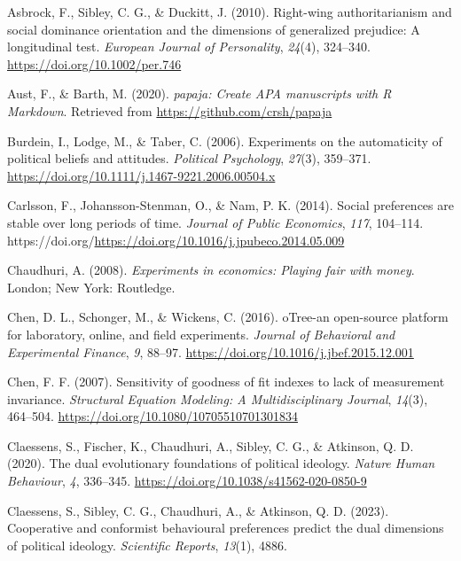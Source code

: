 \documentclass[
  man,floatsintext]{apa6}
\newlength{\cslhangindent}
\newlength{\cslentryspacingunit} %
\newenvironment{CSLReferences}[2] %
 {%
  \setlength{\parindent}{0pt}
  \ifodd #1
  \let\oldpar\par
  \def\par{\hangindent=\cslhangindent\oldpar}
  \fi
  \setlength{\parskip}{#2\cslentryspacingunit}
 }%
 {}
\begin{document}
\hypertarget{refs}{}
\begin{CSLReferences}{1}{0}
\leavevmode{}%
Asbrock, F., Sibley, C. G., \& Duckitt, J. (2010). Right-wing authoritarianism and social dominance orientation and the dimensions of generalized prejudice: A longitudinal test. \emph{European Journal of Personality}, \emph{24}(4), 324--340. \url{https://doi.org/10.1002/per.746}

\leavevmode{}%
Aust, F., \& Barth, M. (2020). \emph{{papaja}: {Create} {APA} manuscripts with {R Markdown}}. Retrieved from \url{https://github.com/crsh/papaja}

\leavevmode{}%
Burdein, I., Lodge, M., \& Taber, C. (2006). Experiments on the automaticity of political beliefs and attitudes. \emph{Political Psychology}, \emph{27}(3), 359--371. \url{https://doi.org/10.1111/j.1467-9221.2006.00504.x}

\leavevmode{}%
Carlsson, F., Johansson-Stenman, O., \& Nam, P. K. (2014). Social preferences are stable over long periods of time. \emph{Journal of Public Economics}, \emph{117}, 104--114. https://doi.org/\url{https://doi.org/10.1016/j.jpubeco.2014.05.009}

\leavevmode{}%
Chaudhuri, A. (2008). \emph{Experiments in economics: Playing fair with money}. London; New York: Routledge.

\leavevmode{}%
Chen, D. L., Schonger, M., \& Wickens, C. (2016). {oTree}-an open-source platform for laboratory, online, and field experiments. \emph{Journal of Behavioral and Experimental Finance}, \emph{9}, 88--97. \url{https://doi.org/10.1016/j.jbef.2015.12.001}

\leavevmode{}%
Chen, F. F. (2007). Sensitivity of goodness of fit indexes to lack of measurement invariance. \emph{Structural Equation Modeling: A Multidisciplinary Journal}, \emph{14}(3), 464--504. \url{https://doi.org/10.1080/10705510701301834}

\leavevmode{}%
Claessens, S., Fischer, K., Chaudhuri, A., Sibley, C. G., \& Atkinson, Q. D. (2020). The dual evolutionary foundations of political ideology. \emph{Nature Human Behaviour}, \emph{4}, 336--345. \url{https://doi.org/10.1038/s41562-020-0850-9}

\leavevmode{}%
Claessens, S., Sibley, C. G., Chaudhuri, A., \& Atkinson, Q. D. (2023). Cooperative and conformist behavioural preferences predict the dual dimensions of political ideology. \emph{Scientific Reports}, \emph{13}(1), 4886.


\end{CSLReferences}
\end{document}
